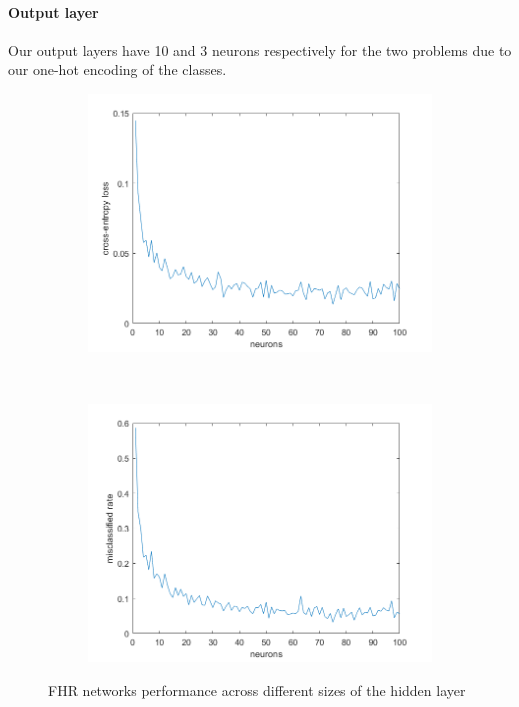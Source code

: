 \documentclass[11pt,a4paper]{article}
\begin{document}
\paragraph{Output layer}
Our output layers have 10 and 3 neurons respectively for the two problems due to our one-hot encoding of the classes.

\begin{figure}[htb]
  \centering
  \begin{subfigure}[b]{0.95\textwidth}
    \centering
    \includegraphics[width=\textwidth]{figures/delta_ce_class.png}
  \end{subfigure}
  ~
  \begin{subfigure}[b]{0.95\textwidth}
    \centering
    \includegraphics[width=\textwidth]{figures/delta_misclass_rate_class.png}
  \end{subfigure}
  \caption{FHR networks performance across different sizes of the hidden layer}
  \label{fig:FHR_performance}
\end{figure}
\end{document}
